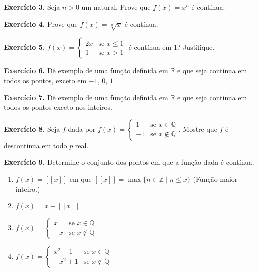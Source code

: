 \documentclass[12pt,a4paper]{article}
\begin{document}
\vspace{0.5cm}
\noindent\textbf{Exercício 3.}
Seja $n > 0$ um natural. Prove que $f(x) = x^n$ é contínua.

\vspace{0.5cm}
\noindent\textbf{Exercício 4.}
Prove que $f(x) = \sqrt[n]{x}$ é contínua.

\vspace{0.5cm}
\noindent\textbf{Exercício 5.}
$f(x) = \begin{cases} 2x & \text{se } x \le 1 \\ 1 & \text{se } x > 1 \end{cases}$ é contínua em $1$? Justifique.

\vspace{0.5cm}
\noindent\textbf{Exercício 6.}
Dê exemplo de uma função definida em $\mathbb{R}$ e que seja contínua em todos os pontos, exceto em $-1$, $0$, $1$.

\vspace{0.5cm}
\noindent\textbf{Exercício 7.}
Dê exemplo de uma função definida em $\mathbb{R}$ e que seja contínua em todos os pontos exceto nos inteiros.

\vspace{0.5cm}
\noindent\textbf{Exercício 8.}
Seja $f$ dada por $f(x) = \begin{cases} 1 & \text{se } x \in \mathbb{Q} \\ -1 & \text{se } x \notin \mathbb{Q} \end{cases}$. Mostre que $f$ é descontínua em todo $p$ real.

\vspace{0.5cm}
\noindent\textbf{Exercício 9.} Determine o conjunto dos pontos em que a função dada é contínua.
\begin{enumerate}
    \renewcommand{\theenumi}{\alph{enumi}}
    \renewcommand{\labelenumi}{\theenumi)}
    \item $f(x) = [\![x]\!]$ em que $[\![x]\!] = \max\{n \in \mathbb{Z} \mid n \le x\}$ (Função maior inteiro.)
    \item $f(x) = x - [\![x]\!]$
    \item $f(x) = \begin{cases} x & \text{se } x \in \mathbb{Q} \\ -x & \text{se } x \notin \mathbb{Q} \end{cases}$
    \item $f(x) = \begin{cases} x^2 - 1 & \text{se } x \in \mathbb{Q} \\ -x^2 + 1 & \text{se } x \notin \mathbb{Q} \end{cases}$
\end{enumerate}
\end{document}
